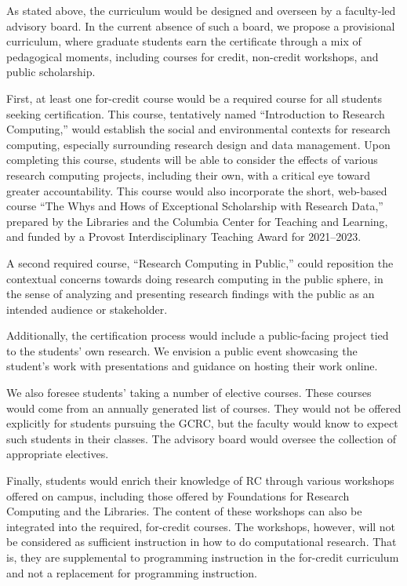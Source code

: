 \documentclass[%
  ,
  article,
  ,
  oneside
  ]{memoir}
\begin{document}
As stated above, the curriculum would be designed and overseen by a
faculty-led advisory board. In the current absence of such a board, we
propose a provisional curriculum, where graduate students earn the
certificate through a mix of pedagogical moments, including courses for
credit, non-credit workshops, and public scholarship.

First, at least one for-credit course would be a required course for all
students seeking certification. This course, tentatively named
``Introduction to Research Computing,'' would establish the social and
environmental contexts for research computing, especially surrounding
research design and data management. Upon completing this course,
students will be able to consider the effects of various research
computing projects, including their own, with a critical eye toward
greater accountability. This course would also incorporate the short,
web-based course ``The Whys and Hows of Exceptional Scholarship with
Research Data,'' prepared by the Libraries and the Columbia Center for
Teaching and Learning, and funded by a Provost Interdisciplinary
Teaching Award for 2021--2023.

A second required course, ``Research Computing in Public,'' could
reposition the contextual concerns towards doing research computing in
the public sphere, in the sense of analyzing and presenting research
findings with the public as an intended audience or stakeholder.

Additionally, the certification process would include a public-facing
project tied to the students' own research. We envision a public event
showcasing the student's work with presentations and guidance on hosting
their work online.

We also foresee students' taking a number of elective courses. These
courses would come from an annually generated list of courses. They
would not be offered explicitly for students pursuing the GCRC, but the
faculty would know to expect such students in their classes. The
advisory board would oversee the collection of appropriate electives.

Finally, students would enrich their knowledge of RC through various
workshops offered on campus, including those offered by Foundations for
Research Computing and the Libraries. The content of these workshops can
also be integrated into the required, for-credit courses. The workshops,
however, will not be considered as sufficient instruction in how to do
computational research. That is, they are supplemental to programming
instruction in the for-credit curriculum and not a replacement for
programming instruction.
\end{document}
